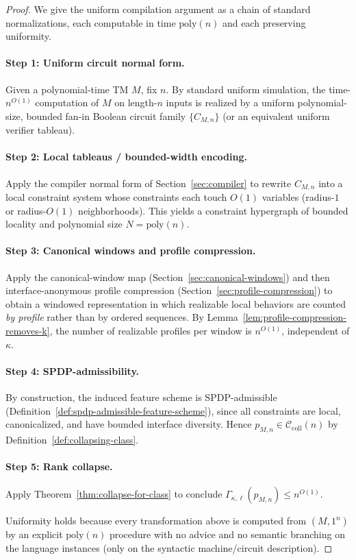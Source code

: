 \documentclass[12pt]{article}
\newcommand{\poly}{\mathrm{poly}}
\theoremstyle{definition}
\theoremstyle{definition}
\theoremstyle{remark}
\theoremstyle{remark}
\begin{document}
\begin{proof}
We give the uniform compilation argument as a chain of standard normalizations,
each computable in time $\poly(n)$ and each preserving uniformity.

\paragraph{Step 1: Uniform circuit normal form.}
Given a polynomial-time TM $M$, fix $n$. By standard uniform simulation, the
time-$n^{O(1)}$ computation of $M$ on length-$n$ inputs is realized by a uniform
polynomial-size, bounded fan-in Boolean circuit family $\{C_{M,n}\}$ (or an
equivalent uniform verifier tableau).

\paragraph{Step 2: Local tableaus / bounded-width encoding.}
Apply the compiler normal form of Section~\ref{sec:compiler} to rewrite
$C_{M,n}$ into a local constraint system whose constraints each touch $O(1)$
variables (radius-$1$ or radius-$O(1)$ neighborhoods). This yields a constraint
hypergraph of bounded locality and polynomial size $N=\poly(n)$.

\paragraph{Step 3: Canonical windows and profile compression.}
Apply the canonical-window map (Section~\ref{sec:canonical-windows}) and then
interface-anonymous profile compression (Section~\ref{sec:profile-compression})
to obtain a windowed representation in which realizable local behaviors are
counted \emph{by profile} rather than by ordered sequences. By
Lemma~\ref{lem:profile-compression-removes-k}, the number of realizable profiles
per window is $n^{O(1)}$, independent of $\kappa$.

\paragraph{Step 4: SPDP-admissibility.}
By construction, the induced feature scheme is SPDP-admissible (Definition~\ref{def:spdp-admissible-feature-scheme}),
since all constraints are local, canonicalized, and have bounded interface
diversity. Hence $p_{M,n}\in\mathcal{C}_{\mathrm{coll}}(n)$ by
Definition~\ref{def:collapsing-class}.

\paragraph{Step 5: Rank collapse.}
Apply Theorem~\ref{thm:collapse-for-class} to conclude
$\Gamma_{\kappa,\ell}(p_{M,n})\le n^{O(1)}$.

Uniformity holds because every transformation above is computed from $(M,1^n)$
by an explicit $\poly(n)$ procedure with no advice and no semantic branching on
the language instances (only on the syntactic machine/circuit description).
\end{proof}
\end{document}
